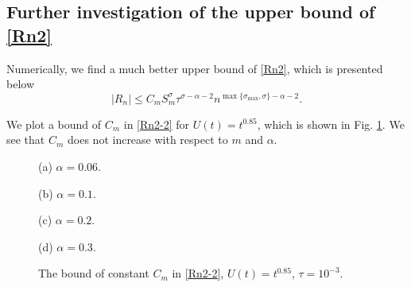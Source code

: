 \documentclass[10pt]{siamltex}
\begin{document}
\subsection{Further investigation of the upper bound of \eqref{Rn2}} Numerically, we find  a much better upper bound of \eqref{Rn2}, which is presented below
\begin{equation}\label{Rn2-2}
|{R_n}|\leq C_mS_m^{\sigma} \tau^{\sigma-\alpha-2} n^{\max\{\sigma_{\max},\sigma\}-\alpha-2}.
\end{equation}

We  plot a bound of $C_m$ in \eqref{Rn2-2} for $U(t)=t^{0.85}$, which is shown in Fig. \ref{fig2-3}. We  see that $C_m$ does not increase with respect to $m$  and $\alpha$.

\begin{figure}[!ht]
\begin{center}
\begin{minipage}{0.45\textwidth}\centering
{}  \par{(a)   $\alpha=0.06$.}
\end{minipage}
\begin{minipage}{0.45\textwidth}\centering
{}   \par{(b)  $\alpha=0.1$.}
\end{minipage}
\begin{minipage}{0.45\textwidth}\centering
{}  \par{(c) $\alpha=0.2$.  }
\end{minipage}
\begin{minipage}{0.45\textwidth}\centering
{}   \par{(d)  $\alpha=0.3$.  }
\end{minipage}
\end{center}
\caption{The  bound of constant $C_m$ in \eqref{Rn2-2},
$U(t)=t^{0.85}$, $\tau=10^{-3}$.\label{fig2-3}}
\end{figure}
\end{document}
